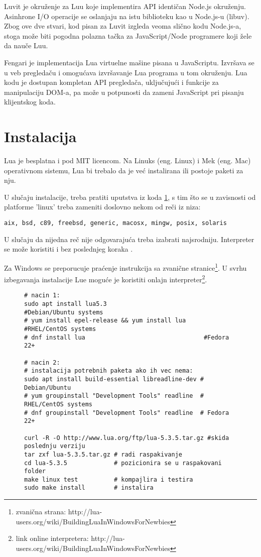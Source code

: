 \documentclass[a4paper]{article}
\begin{document}
Luvit je okruženje za Luu koje implementira API identičan Node.js okruženju. Asinhrone I/O operacije se oslanjaju na istu biblioteku kao u Node.js-u (libuv). Zbog ove dve stvari, kod pisan za Luvit izgleda veoma slično kodu Node.js-a, stoga može biti pogodna polazna tačka za JavaScript/Node programere koji žele da nauče Luu. 

Fengari je implementacija Lua virtuelne mašine pisana u JavaScriptu. Izvršava se u veb pregledaču i omogućava izvršavanje Lua programa u tom okruženju. Lua kodu je dostupan kompletan API pregledača, uključujući i funkcije za manipulaciju DOM-a, pa može u potpunosti da zameni JavaScript pri pisanju klijentskog koda\cite{frameworkFengari}.


\section{Instalacija}
\label{sec:instalacija}
  Lua je besplatna i pod MIT licencom. %
Na Linuks (eng. Linux) i Mek (eng. Mac) operativnom sistemu, Lua bi trebalo da je već instalirana ili postoje paketi za nju. 

U slučaju instalacije, treba pratiti uputstva iz koda \ref{kod_instalacija}, s tim što se u zavisnosti od platforme 'linux' treba zameniti doslovno nekom od reči iz niza:
\begin{verbatim}
aix, bsd, c89, freebsd, generic, macosx, mingw, posix, solaris
\end{verbatim}
 U slučaju da nijedna reč nije odgovarajuća treba izabrati najsrodniju. Interpreter se može koristiti i bez poslednjeg koraka \cite{lua_org}.

 Za Windows se preporucuje praćenje instrukcija sa zvanične stranice\footnote{zvanična strana: http://lua-users.org/wiki/BuildingLuaInWindowsForNewbies}. U svrhu izbegavanja instalacije Lue moguće je koristiti onlajn interpreter\footnote{link online interpretera: http://lua-users.org/wiki/BuildingLuaInWindowsForNewbies}.

\begin{figure}

\begin{lstlisting}[caption={Instalacija iz terminala na linuxu},frame=single, label=simple]
# nacin 1:
sudo apt install lua5.3	                      #Debian/Ubuntu systems 
# yum install epel-release && yum install lua	#RHEL/CentOS systems 
# dnf install lua		                          #Fedora 22+

# nacin 2:
# instalacija potrebnih paketa ako ih vec nema:
sudo apt install build-essential libreadline-dev # Debian/Ubuntu
# yum groupinstall "Development Tools" readline	 # RHEL/CentOS systems 
# dnf groupinstall "Development Tools" readline	 # Fedora 22+

curl -R -O http://www.lua.org/ftp/lua-5.3.5.tar.gz #skida poslednju verziju
tar zxf lua-5.3.5.tar.gz # radi raspakivanje
cd lua-5.3.5             # pozicionira se u raspakovani folder 
make linux test          # kompajlira i testira
sudo make install        # instalira
\end{lstlisting}
\label{kod_instalacija}
\end{figure}
\end{document}
